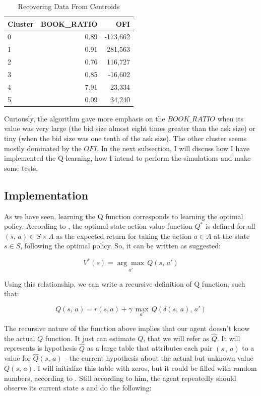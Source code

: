 \documentclass[a4paper]{article}
\begin{document}
\begin{table}[ht!]
\centering
\begin{tabular}{l|rr}
{Cluster} &    BOOK\_RATIO &    OFI \\
\midrule
0 &  0.89 &  -173,662 \\
1 &  0.91 &  281,563 \\
2 &  0.76 &  116,727 \\
3 &  0.85 &  -16,602 \\
4 &  7.91 &  23,334 \\
5 &  0.09 &  34,240 \\

\end{tabular}
\caption{\label{tab:cluster_recover}Recovering Data From Centroids}
\end{table}

Curiously, the algorithm gave more emphasis on the $BOOK\_RATIO$  when its value was very large (the bid size almost eight times greater than the ask size) or tiny (when the bid size was one tenth of the ask size). The other cluster seems mostly dominated by the $OFI$. In the next subsection, I will discuss how I have implemented the Q-learning, how I intend to perform the simulations and make some tests.


\subsection{Implementation}
As we have seen, learning the Q function corresponds to learning the optimal policy. According to \cite{Mohri_2012}, the optimal state-action value function $Q^{*}$ is defined for all $(s, \, a) \in S \times A$ as the expected return for taking the action $a \in A$ at the state $s \in S$, following the optimal policy. So, it can be written as \cite{Mitchell} suggested:

$$V^{*}(s) = \underset{a'}{\arg \max} \, Q(s, \, a')$$

Using this relationship, we can write a recursive definition of Q function, such that:

$$Q(s, \, a) = r(s, a) + \gamma \, \underset{a'}{\max} \, Q(\delta(s,\, a), \, a')$$

The recursive nature of the function above implies that our agent doesn't know the actual $Q$ function. It just can estimate $Q$, that we will refer as $\hat{Q}$. It will represents is hypothesis $\hat{Q}$ as a large table that attributes each pair $(s\, , \, a)$ to a value for $\hat{Q}(s,\, a)$ - the current hypothesis about the actual but unknown value $Q(s, \, a)$. I will initialize this table with zeros, but it could be filled with random numbers, according to \cite{Mitchell}. Still according to him, the agent repeatedly should observe its current state $s$ and do the following:
\end{document}
